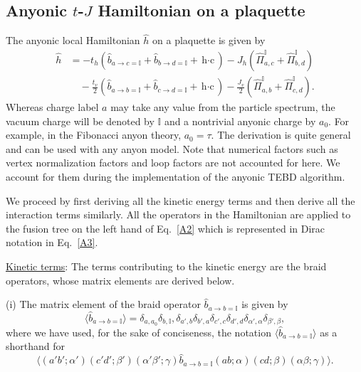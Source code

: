 \documentclass[aps,reprint,superscriptaddress,amsmath,amssymb,amsfonts,prb]{revtex4-1}
\newcommand{\mbb}[1]{\mathbb{#1}}
\begin{document}
\subsection{Anyonic $t$-$J$ Hamiltonian on a plaquette} \label{HamiltonianAnyonicLadder}
The anyonic local Hamiltonian $\hat{h}$ on a plaquette is given by
\begin{align}
 \hat{h} &= -t_h \left( \hat{b}_{a \rightarrow c=\mbb{I}}  + \hat{b}_{b \rightarrow d=\mbb{I}} + \text{h$\cdot$c} \right)  - J_h \left( \hat{\Pi}^{\mathbb{I}}_{a,c} + \hat{\Pi}^{\mathbb{I}}_{b,d} \right) \nonumber \\
& \quad - \frac{t_v}{2} \left( \hat{b}_{a \rightarrow b=\mbb{I}} + \hat{b}_{c \rightarrow d=\mbb{I}} + \text{h$\cdot$c} \right) -  \frac{J_v}{2} \left( \hat{\Pi}^{\mathbb{I}}_{a,b} + \hat{\Pi}^{\mathbb{I}}_{c,d} \right) .
\end{align}
Whereas charge label $a$ may take any value from the particle spectrum, the vacuum charge will be denoted by $\mbb{I}$ and a nontrivial anyonic charge by $a_0$. For example, in the Fibonacci anyon theory, $a_0 = \tau$. The derivation is quite general and can be used with any anyon model. Note that numerical factors such as vertex normalization factors and loop factors are not accounted for here. We account for them during the implementation of the anyonic TEBD algorithm. 

We proceed by first deriving all the kinetic energy terms and then derive all the interaction terms similarly. All the operators in the Hamiltonian are applied to the fusion tree on the left hand of Eq.~\ref{A2} which is represented in Dirac notation in Eq.~\ref{A3}. 

\underline{Kinetic terms}:
The terms contributing to the kinetic energy are the braid operators, whose matrix elements are derived below. 

(i) The matrix element of the braid operator $\hat{b}_{a \rightarrow b=\mbb{I}}$ is given by
\begin{equation}
\langle \hat{b}_{a \rightarrow b=\mbb{I}} \rangle = \delta_{a,a_0} \delta_{b,\mbb{I}}, \delta_{a',b} \delta_{b',a} \delta_{c',c} \delta_{d',d} \delta_{{\alpha}',{\alpha}} \delta_{{\beta}',\beta}   ,
\end{equation}
where we have used, for the sake of conciseness, the notation $\langle \hat{b}_{a \rightarrow b=\mbb{I}} \rangle$ as a shorthand for
\begin{equation}
\langle (a'b';\alpha')(c'd';\beta')(\alpha' \beta'; \gamma) \hat{b}_{a \rightarrow b=\mbb{I}} (ab;\alpha)(cd;\beta)(\alpha \beta; \gamma) \rangle .
\end{equation}
\end{document}
